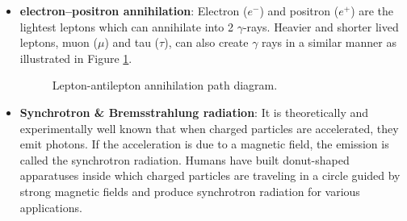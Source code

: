 \begin{itemize}
    \item \textbf{electron–positron annihilation}:
    Electron ($e^-$) and positron ($e^+$) are the lightest
    leptons which can annihilate into 2 $\gamma$-rays.
    Heavier and shorter lived leptons, muon ($\mu$) and
    tau ($\tau$), can also create $\gamma$ rays in a similar
    manner as illustrated in Figure \ref{fig:lepton_annihilation}.

    \begin{figure}[h!]
        \centering
            \hfill
            \hfill
            \caption{Lepton-antilepton annihilation path diagram.}
           \label{fig:lepton_annihilation}
    \end{figure}

    \item \textbf{Synchrotron \& Bremsstrahlung radiation}:
    It is theoretically and experimentally well known that when
    charged particles are accelerated, they emit photons.
    If the acceleration is due to a magnetic field, the emission
    is called the synchrotron radiation. Humans have built
    donut-shaped apparatuses inside which charged particles
    are traveling in a circle guided by strong magnetic fields
    and produce synchrotron radiation for various applications.


\end{itemize}
